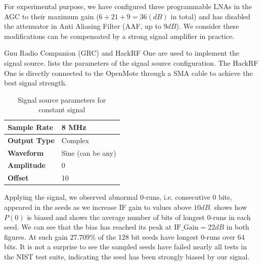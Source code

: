For experimental purpose, we have configured three programmable LNAs in the AGC to their maximum gain ($6 + 21 + 9 = 36(dB)$ in total) and has disabled the attenuator in Anti Aliasing Filter (AAF, up to $9dB$). We consider these modifications can be compensated by a strong signal amplifier in practice.

Gnu Radio Companion (GRC)\cite{GRC} and HackRF One\cite{HackRFOne} are used to implement the signal source.  lists the parameters of the signal source configuration. The HackRF One is directly connected to the OpenMote through a SMA cable to achieve the best signal strength.

\begin{table}[!t]
\caption{Signal source parameters for constant signal}
\label{ConstantSignal}
\centering
\begin{tabular}{|l|l|}
\hline
\textbf{Sample Rate} & 8 MHz             \\ \hline
\textbf{Output Type} & Complex           \\ \hline
\textbf{Waveform}    & Sine (can be any) \\ \hline
\textbf{Amplitude}   & 0                 \\ \hline
\textbf{Offset}      & 10                \\ \hline
\end{tabular}
\end{table}

Applying the signal, we observed abnormal 0-runs, i.e. consecutive $0$ bits, appeared in the seeds as we increase IF gain to values above $10dB$.  shows how $P(0)$ is biased and  shows the average number of bits of longest 0-runs in each seed. We can see that the bias has reached its peak at $\text{IF\_Gain} = 22dB$ in both figures. At such gain $27.709\%$ of the 128 bit seeds have longest 0-runs over $64$ bits. It is not a surprise to see the sampled seeds have failed nearly all tests in the NIST test suite, indicating the seed has been strongly biased by our signal. 


